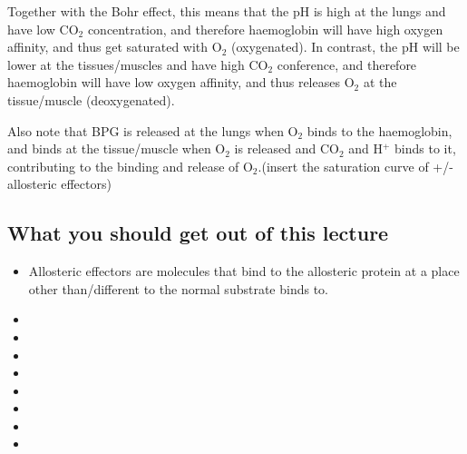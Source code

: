 Together with the Bohr effect, this means that the pH is high at the lungs and have low CO$_2$ concentration, and therefore haemoglobin will have high oxygen affinity, and thus get saturated with O$_2$ (oxygenated).
In contrast, the pH will be lower at the tissues/muscles and have high CO$_2$ conference, and therefore haemoglobin will have low oxygen affinity, and thus releases O$_2$ at the tissue/muscle (deoxygenated).

Also note that BPG is released at the lungs when O$_2$ binds to the haemoglobin, and binds at the tissue/muscle when O$_2$ is released and CO$_2$ and H$^+$ binds to it, contributing to the binding and release of O$_2$.(insert the saturation curve of +/- allosteric effectors)


\subsection*{What you should get out of this lecture}

\begin{itemize}
	\item Allosteric effectors are molecules that bind to the allosteric protein at a place other than/different to the normal substrate binds to.
	\item
	\item
	\item
	\item
	\item
	\item
	\item
	\item
\end{itemize}
